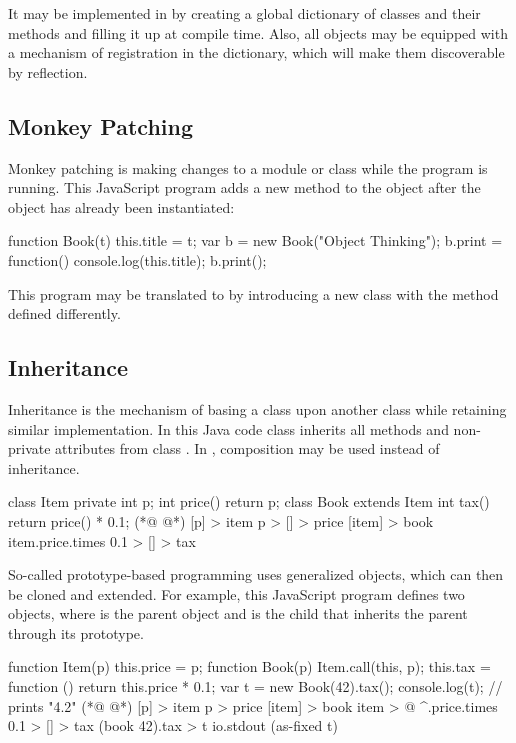 It may be implemented in \eolang{} by creating a global dictionary of
  classes and their methods and filling it up at compile time.
Also, all objects may be equipped with a mechanism of registration in
  the dictionary, which will make them discoverable by reflection.

\subsection{Monkey Patching}

Monkey patching is making changes to a module or class
  while the program is running.
This JavaScript program adds a new method  to the object 
  after the object has already been instantiated:

\begin{ffcode}
function Book(t) { this.title = t; }
var b = new Book("Object Thinking");
b.print = function() {
  console.log(this.title);
}
b.print();
\end{ffcode}

This program may be translated to \eolang{} by introducing
  a new  class with the  method defined differently.

\subsection{Inheritance}
\label{sec:inheritance}

Inheritance is the mechanism of basing a class upon another class
  while retaining similar implementation.
In this Java code class  inherits all methods
  and non-private attributes from class .
In \eolang{}, composition may be used instead of inheritance.

\begin{ffcode}
class Item {
  private int p;
  int price() { return p; }
}
class Book extends Item {
  int tax() {
    return price() * 0.1;
  }
}
(*@ \ffcolumnbreak @*)
[p] > item
  p > [] > price
[item] > book
  item.price.times 0.1 > [] > tax
\end{ffcode}

So-called prototype-based programming uses generalized objects,
  which can then be cloned and extended.
For example, this JavaScript program defines two objects,
  where  is the parent object and  is the child
  that inherits the parent through its prototype.

\begin{ffcode}
function Item(p) {
  this.price = p;
}
function Book(p) {
  Item.call(this, p);
  this.tax = function () {
    return this.price * 0.1;
  }
}
var t = new Book(42).tax();
console.log(t); // prints "4.2"
(*@ \ffcolumnbreak @*)
[p] > item
  p > price
[item] > book
  item > @
  ^.price.times 0.1 > [] > tax
(book 42).tax > t
io.stdout (as-fixed t)
\end{ffcode}

